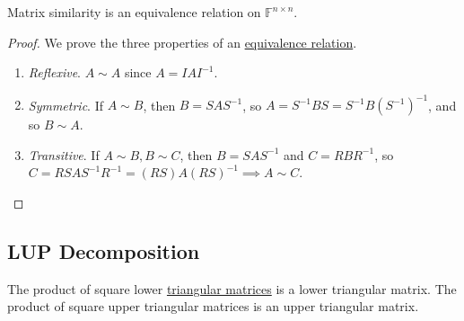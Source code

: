 	\begin{lemma}
	  \label{thm:similarity-is-an-equivalence-relation}
		Matrix similarity is an equivalence relation on $\mathbb{F}^{n \times n}$. 
	\end{lemma}
	\begin{proof}
	  We prove the three properties of an \hyperref[st-def:equivalence_relation]{equivalence relation}. 
		\begin{enumerate}
			\item \textit{Reflexive}. $A \sim A$ since $A = I A I^{-1}$. 
			\item \textit{Symmetric}. If $A \sim B$, then $B = S A S^{-1}$, so $A = S^{-1} B S = S^{-1} B (S^{-1})^{-1}$, and so $B \sim A$. 
			\item \textit{Transitive}. If $A \sim B, B \sim C$, then $B = SAS^{-1}$ and $C = R B R^{-1}$, so $C = R S A S^{-1} R^{-1} = (RS) A (RS)^{-1} \implies A \sim C$. 
		\end{enumerate}
	\end{proof}

\subsection{LUP Decomposition}

  \begin{theorem}
    \label{thm:triangularity-is-preserved-under-multiplication}
    The product of square lower \hyperref[def:triangular-matrices]{triangular matrices} is a lower triangular matrix. The product of square upper triangular matrices is an upper triangular matrix. 
  \end{theorem}

